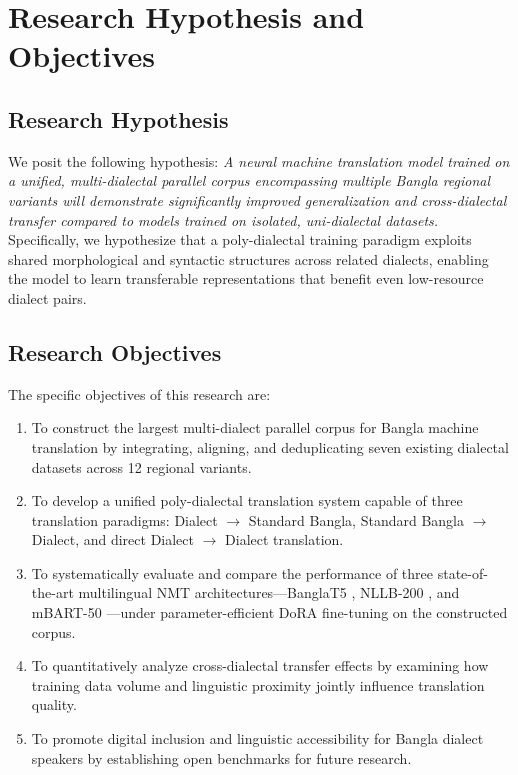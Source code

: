 \documentclass[12pt,a4paper]{article}
\begin{document}
\section{Research Hypothesis and Objectives}

\subsection{Research Hypothesis}
We posit the following hypothesis: \textit{A neural machine translation model trained on a unified, multi-dialectal parallel corpus encompassing multiple Bangla regional variants will demonstrate significantly improved generalization and cross-dialectal transfer compared to models trained on isolated, uni-dialectal datasets.} Specifically, we hypothesize that a poly-dialectal training paradigm exploits shared morphological and syntactic structures across related dialects, enabling the model to learn transferable representations that benefit even low-resource dialect pairs.

\subsection{Research Objectives}
The specific objectives of this research are:
\begin{enumerate}
    \item To construct the largest multi-dialect parallel corpus for Bangla machine translation by integrating, aligning, and deduplicating seven existing dialectal datasets across 12 regional variants.
    \item To develop a unified poly-dialectal translation system capable of three translation paradigms: Dialect $\rightarrow$ Standard Bangla, Standard Bangla $\rightarrow$ Dialect, and direct Dialect $\rightarrow$ Dialect translation.
    \item To systematically evaluate and compare the performance of three state-of-the-art multilingual NMT architectures---BanglaT5 \cite{bhattacharjee-etal-2023-banglanlg}, NLLB-200 \cite{nllb2022}, and mBART-50 \cite{tang2020multilingual}---under parameter-efficient DoRA \cite{liu2024dora} fine-tuning on the constructed corpus.
    \item To quantitatively analyze cross-dialectal transfer effects by examining how training data volume and linguistic proximity jointly influence translation quality.
    \item To promote digital inclusion and linguistic accessibility for Bangla dialect speakers by establishing open benchmarks for future research.
\end{enumerate}
\end{document}
